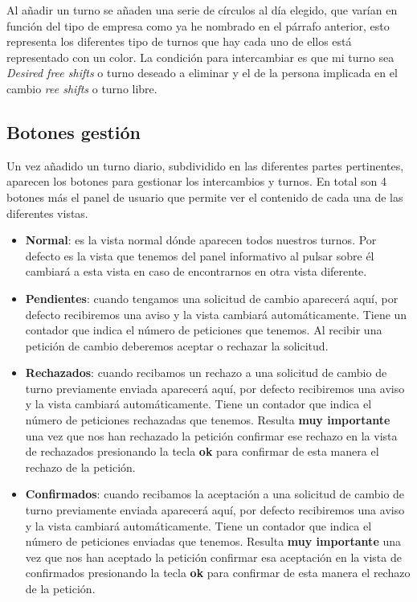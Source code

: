 Al añadir un turno se añaden una serie de círculos al día elegido, que varían en función del tipo de empresa como ya he nombrado en el párrafo anterior, esto representa los diferentes tipo de turnos que hay cada uno de ellos está representado con un color. La condición para intercambiar es que mi turno sea  \emph{Desired free shifts} o turno deseado a eliminar y el de la persona implicada en el cambio  \emph{ree shifts} o turno libre.


\subsection{Botones gestión}
Un vez añadido un turno diario, subdividido en las diferentes partes pertinentes, aparecen los botones para gestionar los intercambios y turnos. En total son 4 botones más el panel de usuario que permite ver el contenido de cada una de las diferentes vistas.

\begin{itemize}

\item \textbf{Normal}: es la vista normal dónde aparecen todos nuestros turnos. Por defecto es la vista que tenemos del panel informativo al pulsar sobre él cambiará a esta vista en caso de encontrarnos en otra vista diferente.

\item \textbf{Pendientes}: cuando tengamos una solicitud de cambio aparecerá aquí, por defecto recibiremos una aviso y la vista cambiará automáticamente. Tiene un contador que indica el número de peticiones que tenemos. Al recibir una petición de cambio deberemos aceptar o rechazar la solicitud.

\item \textbf{Rechazados}: cuando recibamos un rechazo a una solicitud de cambio de turno previamente enviada aparecerá aquí, por defecto recibiremos una aviso y la vista cambiará automáticamente. Tiene un contador que indica el número de peticiones rechazadas que tenemos. Resulta \textbf{muy importante} una vez que nos han rechazado la petición confirmar ese rechazo en la vista de rechazados presionando la tecla \textbf{ok} para confirmar de esta manera el rechazo de la petición. 

\item \textbf{Confirmados}: cuando recibamos la aceptación a una solicitud de cambio de turno previamente enviada aparecerá aquí, por defecto recibiremos una aviso y la vista cambiará automáticamente. Tiene un contador que indica el número de peticiones enviadas que tenemos. Resulta \textbf{muy importante} una vez que nos han aceptado la petición confirmar esa aceptación en la vista de confirmados presionando la tecla \textbf{ok} para confirmar de esta manera el rechazo de la petición.




\end{itemize} 


